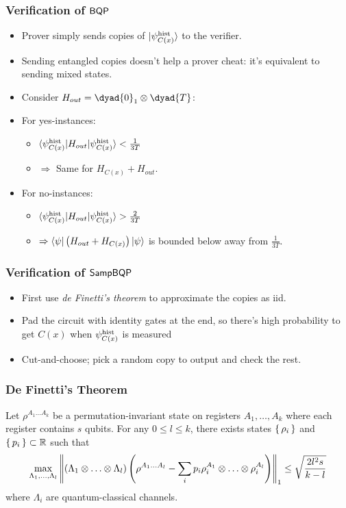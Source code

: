 \documentclass{beamer}
\begin{document}
\begin{frame}
	\frametitle{Verification of $\operatorname{\mathsf{BQP}}$}
	\begin{itemize}[<+->]
		\item Prover simply sends copies of $\ket{\psi_{C(x)}^{\mathrm{hist}}}$ to the verifier.
		\item Sending entangled copies doesn't help a prover cheat: it's equivalent to sending mixed states.
		\item Consider $H_{out}=\dyad{0}_1\otimes\dyad{T}$:
		\item For yes-instances:
			\begin{itemize}[<+->]
				\item $\braket{\psi_{C(x)}^{\mathrm{hist}}|H_{out}|\psi_{C(x)}^{\mathrm{hist}}}<\frac{1}{3T}$
				\item $\Rightarrow$ Same for $H_{C(x)}+H_{out}$.
			\end{itemize}
		\item For no-instances:
			\begin{itemize}[<+->]
				\item $\braket{\psi_{C(x)}^{\mathrm{hist}}|H_{out}|\psi_{C(x)}^{\mathrm{hist}}}>\frac{2}{3T}$
				\item $\Rightarrow\braket{\psi|\left(H_{out}+H_{C(x)}\right)|\psi}$ is bounded below away from $\frac{1}{3T}$.
			\end{itemize}
	\end{itemize}
\end{frame}

\begin{frame}
	\frametitle{Verification of $\operatorname{\mathsf{SampBQP}}$}
	\begin{itemize}[<+->]
		\item First use \emph{de Finetti's theorem} to approximate the copies as iid.
		\item Pad the circuit with identity gates at the end, so there's high probability to get $C(x)$ when $\psi_{C(x)}^{\mathrm{hist}}$ is measured
		\item Cut-and-choose; pick a random copy to output and check the rest.
	\end{itemize}
\end{frame}

\begin{frame}
	\frametitle{De Finetti's Theorem}
	\begin{theorem}
		\label{deFinetti}
		Let $\rho^{A_1\ldots A_k}$ be a permutation-invariant state on registers $A_1,\ldots,A_k$ where each register contains $s$ qubits.
		For any $0\leq l\leq k$,  there exists states $\set{\rho_i}$ and $\set{p_i}\subset\mathbb{R}$ such that
		$$\max_{\Lambda_1,\ldots,\Lambda_l}
		\left\lVert(\Lambda_1\otimes\ldots\otimes\Lambda_l)\left(\rho^{A_1\ldots A_l}-\sum_ip_i\rho_i^{A_1}\otimes\ldots\otimes\rho_i^{A_l}\right)\right\rVert_1
		\leq\sqrt{\frac{2l^2s}{k-l}}$$
		where $\Lambda_i$ are quantum-classical channels.
	\end{theorem}

\end{frame}
\end{document}
